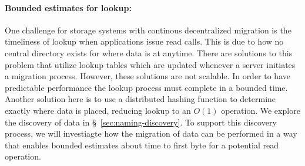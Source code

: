 \paragraph{Bounded estimates for lookup:}
One challenge for storage systems with continous decentralized migration is
the timeliness of lookup when applications issue read calls. This is due to
how no central directory exists for where data is at anytime. There are
solutions to this problem that utilize lookup tables which are updated
whenever a server initiates a migration process. However, these solutions
are not scalable. In order to have predictable performance the lookup
process must complete in a bounded time. Another solution here is to use a
distributed hashing function to determine exactly where data is placed,
reducing lookup to an $O(1)$ operation. We explore the discovery of data in
\S~\ref{sec:naming-discovery}. To support this discovery process, we will
investiagte how the migration of data can be performed in a way that enables
bounded estimates about time to first byte for a potential read operation.






